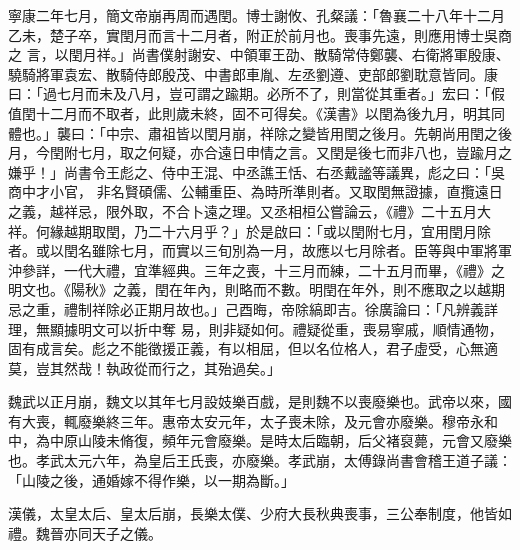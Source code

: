 \begin{pinyinscope}
 寧康二年七月，簡文帝崩再周而遇閏。博士謝攸、孔粲議：「魯襄二十八年十二月乙未，楚子卒，實閏月而言十二月者，附正於前月也。喪事先遠，則應用博士吳商之
 言，以閏月祥。」尚書僕射謝安、中領軍王劭、散騎常侍鄭襲、右衛將軍殷康、驍騎將軍袁宏、散騎侍郎殷茂、中書郎車胤、左丞劉遵、吏部郎劉耽意皆同。康曰：「過七月而未及八月，豈可謂之踰期。必所不了，則當從其重者。」宏曰：「假值閏十二月而不取者，此則歲未終，固不可得矣。《漢書》以閏為後九月，明其同體也。」襲曰：「中宗、肅祖皆以閏月崩，祥除之變皆用閏之後月。先朝尚用閏之後月，今閏附七月，取之何疑，亦合遠日申情之言。又閏是後七而非八也，豈踰月之嫌乎！」尚書令王彪之、侍中王混、中丞譙王恬、右丞戴謐等議異，彪之曰：「吳商中才小官，
 非名賢碩儒、公輔重臣、為時所準則者。又取閏無證據，直攬遠日之義，越祥忌，限外取，不合卜遠之理。又丞相桓公嘗論云，《禮》二十五月大祥。何緣越期取閏，乃二十六月乎？」於是啟曰：「或以閏附七月，宜用閏月除者。或以閏名雖除七月，而實以三旬別為一月，故應以七月除者。臣等與中軍將軍沖參詳，一代大禮，宜準經典。三年之喪，十三月而練，二十五月而畢，《禮》之明文也。《陽秋》之義，閏在年內，則略而不數。明閏在年外，則不應取之以越期忌之重，禮制祥除必正期月故也。」己酉晦，帝除縞即吉。徐廣論曰：「凡辨義詳理，無顯據明文可以折中奪
 易，則非疑如何。禮疑從重，喪易寧戚，順情通物，固有成言矣。彪之不能徵援正義，有以相屈，但以名位格人，君子虛受，心無適莫，豈其然哉！執政從而行之，其殆過矣。」



 魏武以正月崩，魏文以其年七月設妓樂百戲，是則魏不以喪廢樂也。武帝以來，國有大喪，輒廢樂終三年。惠帝太安元年，太子喪未除，及元會亦廢樂。穆帝永和中，為中原山陵未脩復，頻年元會廢樂。是時太后臨朝，后父褚裒薨，元會又廢樂也。孝武太元六年，為皇后王氏喪，亦廢樂。孝武崩，太傅錄尚書會稽王道子議：「山陵之後，通婚嫁不得作樂，以一期為斷。」



 漢儀，太皇太后、皇太后崩，長樂太僕、少府大長秋典喪事，三公奉制度，他皆如禮。魏晉亦同天子之儀。




\end{pinyinscope}
